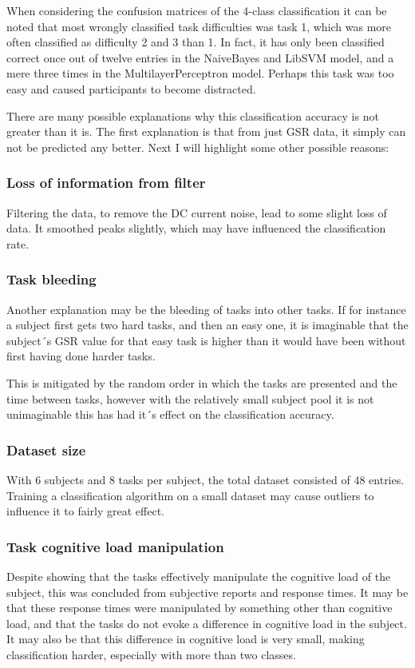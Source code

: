 \documentclass[11pt,leqno,a4paper]{report} %
\begin{document}
When considering the confusion matrices of the 4-class classification it can be noted that most wrongly classified task difficulties was task 1, which was more often classified as difficulty 2 and 3 than 1. In fact, it has only been classified correct once out of twelve entries in the NaiveBayes and LibSVM model, and a mere three times in the MultilayerPerceptron model. Perhaps this task was too easy and caused participants to become distracted.

There are many possible explanations why this classification accuracy is not greater than it is. The first explanation is that from just GSR data, it simply can not be predicted any better. Next I will highlight some other possible reasons:

\subsubsection{Loss of information from filter}
Filtering the data, to remove the DC current noise, lead to some slight loss of data. It smoothed peaks slightly, which may have influenced the classification rate.


\subsubsection{Task bleeding}
Another explanation may be the bleeding of tasks into other tasks. If for instance a subject first gets two hard tasks, and then an easy one, it is imaginable that the subject´s GSR value for that easy task is higher than it would have been without first having done harder tasks. 

This is mitigated by the random order in which the tasks are presented and the time between tasks, however with the relatively small subject pool it is not unimaginable this has had it´s effect on the classification accuracy.


\subsubsection{Dataset size}
With 6 subjects and 8 tasks per subject, the total dataset consisted of 48 entries. Training a classification algorithm on a small dataset may cause outliers to influence it to fairly great effect.

\subsubsection{Task cognitive load manipulation}
Despite \citep{Nourbakhsh2013} showing that the tasks effectively manipulate the cognitive load of the subject, this was concluded from subjective reports and response times. It may be that these response times were manipulated by something other than cognitive load, and that the tasks do not evoke a difference in cognitive load in the subject. It may also be that this difference in cognitive load is very small, making classification harder, especially with more than two classes.
\end{document}
